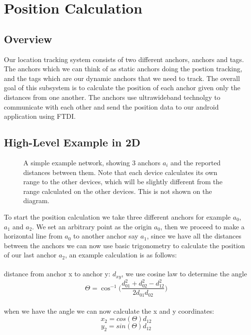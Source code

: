 

\chapter{Position Calculation} %

\label{PositionCalculation}


\section{Overview}

Our location tracking system consists of two different anchors, anchors and tags. The anchors which we can think of as static anchors doing the postion tracking, and the tags which are our dynamic anchors that we need to track. The overall goal of this subsystem is to calculate the position of each anchor given only the distances from one another.
The anchors use ultrawideband technolgy to communicate with each other and send the position data to our android application using FTDI.

\section{High-Level Example in 2D}

\begin{figure}
	\centering
	
	\decoRule
	\caption{A simple example network, showing 3 anchors $a_i$ and the reported distances between them. Note that each device calculates its own range to the other devices, which will be slightly different from the range calculated on the other devices. This is not shown on the diagram.}
	\label{fig:PositionCalculationNetwork}
\end{figure}

To start the position calculation we take three different anchors for example $a_{0}$, $ a_{1}$  and $a_{2}$. We set an arbitrary point as the origin $a_{0}$, then we proceed to make a horizontal line from $a_{0}$ to another anchor say $a_{1}$, since we have all the distances between the anchors we can now use basic trigonometry to calculate the position of our last anchor $a_{2}$,
an example calculation is as follows:
\\\\
distance from anchor x to anchor y: $d_{xy}$, we use cosine law to determine the angle
\\
\[ \Theta = \cos ^{ - 1}\Big(\frac{d_{01}^2 + d_{02}^2 - d_{12}^2 }{2 d_{01} d_{02}}\Big)\]
\\
when we have the angle we can now calculate the x and y coordinates:
\\
\[ x_2 = cos(\Theta) d_{12} \]
\[ y_2 = sin(\Theta) d_{12} \]

